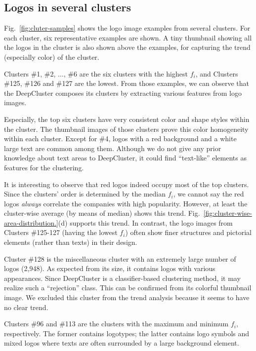 \documentclass[runningheads]{llncs}
\begin{document}
\subsection{Logos in several clusters\label{sec:cluster-members}}
Fig.~\ref{fig:cluter-samples} shows the logo image examples from several clusters. For each cluster, six representative examples are shown. A tiny thumbnail showing all the logos in the cluster is also shown above the examples, for capturing the trend (especially  color) of the cluster.
\par
Clusters \#1, \#2, $\ldots$, \#6 are the six clusters with the highest $f_i$, and Clusters \#125, \#126 and \#127 are the lowest. From those examples, we can observe that the DeepCluster composes its clusters by extracting various features from logo images. \par
%
Especially, the top six clusters have very consistent color and shape styles within the cluster. The thumbnail images of those clusters prove this color homogeneity within each cluster.
Except for \#4, logos with a red background and a white large text are common among them. Although we do not give any prior knowledge about text areas to DeepCluster, it could find ``text-like'' elements as features for the clustering.\par
%
It is interesting to observe that red logos indeed occupy most of the top clusters. Since the clusters' order is determined by the median $f_i$, we cannot say the red logos {\it always} correlate the companies with high popularity. However, at least the cluster-wise average (by means of median) shows this trend.  Fig.~\ref{fig:cluster-wise-area-distribution.}(d) supports this trend.
In contrast, the logo images from Clusters \#125-127 (having the lowest $f_i$) often show finer structures and pictorial elements (rather than texts) in their design.\par
%
Cluster \#128 is the miscellaneous cluster with an extremely large number of logos (2,948). As expected from its size, it contains logos with various appearances. Since DeepCluster is a classifier-based clustering method, it may realize such a ``rejection'' class. This can be confirmed from its colorful thumbnail image.
We excluded this cluster from the trend analysis because it seems to have no clear trend.\par
Clusters \#96 and \#113 are the clusters with the maximum and minimum $f_i$, respectively. The former contains logotypes; the latter contains logo symbols and mixed logos where texts are often surrounded by a large background element.
\end{document}

